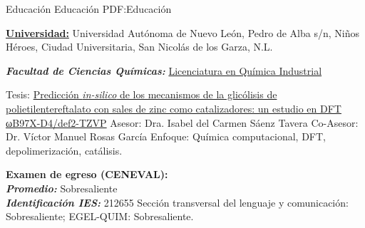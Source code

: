 \Section
	{Educación}
	{Educación}
	{PDF:Educación}


%




\Entry
	\href{https://www.uanl.mx}
	{\textbf{Universidad:}}
	\hfill
	\Gap
	Universidad Autónoma de Nuevo León, Pedro de Alba s/n, Niños Héroes, Ciudad Universitaria, San Nicolás de los Garza, N.L.

\Gap

\BulletItem
	\textbf{\textit{Facultad de Ciencias Químicas:}}
	\href{http://www.fcq.uanl.mx/}
	{Licenciatura en Química Industrial}
	\hfill
	\begin{Detail}
		\SubBulletItem
		Tesis:
		\href{https://www.icloud.com/iclouddrive/0cfgD6maOU4-X1y5lNikwk4eQ#PEAG-Tesis_final}
		{Predicción \textit{in-silico} de los mecanismos de la glicólisis de polietilentereftalato con sales de zinc como catalizadores: un estudio en DFT ωB97X-D4/def2-TZVP} 
		\SubSubBulletItem
		Asesor:
		Dra. Isabel del Carmen Sáenz Tavera
		\SubSubBulletItem
		Co-Asesor:
		Dr. Víctor Manuel Rosas García
		\SubSubBulletItem
		Enfoque:
		Química computacional, DFT, depolimerización, catálisis.

    \Gap

		\SubBulletItem
		\textbf{Examen de egreso (CENEVAL):}  \\
		\textit{\textbf{Promedio:}} Sobresaliente\\
		\textit{\textbf{Identificación IES:}} 212655
		\SubSubBulletItem Sección transversal del lenguaje y comunicación: Sobresaliente;
		\SubSubBulletItem EGEL-QUIM: Sobresaliente.
	\end{Detail}

